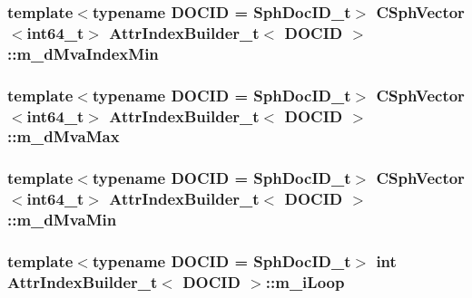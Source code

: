 \hypertarget{classAttrIndexBuilder__t_a595ecd7b9b0bca9541029e6169d4e7cd}{
\subsubsection[{m\-\_\-d\-Mva\-Index\-Min}]{\setlength{\rightskip}{0pt plus 5cm}template$<$typename D\-O\-C\-I\-D  = Sph\-Doc\-I\-D\-\_\-t$>$ {\bf C\-Sph\-Vector}$<${\bf int64\-\_\-t}$>$ {\bf Attr\-Index\-Builder\-\_\-t}$<$ D\-O\-C\-I\-D $>$\-::m\-\_\-d\-Mva\-Index\-Min\hspace{0.3cm}{\ttfamily [private]}}}\label{classAttrIndexBuilder__t_a595ecd7b9b0bca9541029e6169d4e7cd}
\hypertarget{classAttrIndexBuilder__t_a8113ec4e80166abca4b595374f848816}{
\subsubsection[{m\-\_\-d\-Mva\-Max}]{\setlength{\rightskip}{0pt plus 5cm}template$<$typename D\-O\-C\-I\-D  = Sph\-Doc\-I\-D\-\_\-t$>$ {\bf C\-Sph\-Vector}$<${\bf int64\-\_\-t}$>$ {\bf Attr\-Index\-Builder\-\_\-t}$<$ D\-O\-C\-I\-D $>$\-::m\-\_\-d\-Mva\-Max\hspace{0.3cm}{\ttfamily [private]}}}\label{classAttrIndexBuilder__t_a8113ec4e80166abca4b595374f848816}
\hypertarget{classAttrIndexBuilder__t_a7710364ecf78939b3fcac7888066a854}{
\subsubsection[{m\-\_\-d\-Mva\-Min}]{\setlength{\rightskip}{0pt plus 5cm}template$<$typename D\-O\-C\-I\-D  = Sph\-Doc\-I\-D\-\_\-t$>$ {\bf C\-Sph\-Vector}$<${\bf int64\-\_\-t}$>$ {\bf Attr\-Index\-Builder\-\_\-t}$<$ D\-O\-C\-I\-D $>$\-::m\-\_\-d\-Mva\-Min\hspace{0.3cm}{\ttfamily [private]}}}\label{classAttrIndexBuilder__t_a7710364ecf78939b3fcac7888066a854}
\hypertarget{classAttrIndexBuilder__t_aeab17a1a912318a2223d618b6897b09f}{
\subsubsection[{m\-\_\-i\-Loop}]{\setlength{\rightskip}{0pt plus 5cm}template$<$typename D\-O\-C\-I\-D  = Sph\-Doc\-I\-D\-\_\-t$>$ {\bf int} {\bf Attr\-Index\-Builder\-\_\-t}$<$ D\-O\-C\-I\-D $>$\-::m\-\_\-i\-Loop\hspace{0.3cm}{\ttfamily [private]}}}\label{classAttrIndexBuilder__t_aeab17a1a912318a2223d618b6897b09f}
